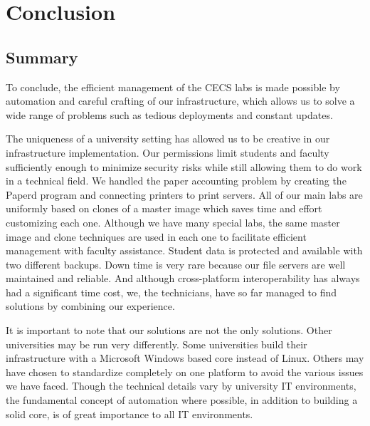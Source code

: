 \chapter{Conclusion} \label{ch:conclusion}
\section{Summary} \label{sec:summary}
To conclude, the efficient management of the CECS labs is made possible by automation and careful crafting of our infrastructure, which allows us to solve a wide range of problems such as tedious deployments and constant updates.  

The uniqueness of a university setting has allowed us to be creative in our infrastructure implementation.  Our permissions limit students and faculty sufficiently enough to minimize security risks while still allowing them to do work in a technical field.  We handled the paper accounting problem by creating the Paperd program and connecting printers to print servers.  All of our main labs are uniformly based on clones of a master image which saves time and effort customizing each one.  Although we have many special labs, the same master image and clone techniques are used in each one to facilitate efficient management with faculty assistance.  Student data is protected and available with two different backups.  Down time is very rare because our file servers are well maintained and reliable.  And although cross-platform interoperability has always had a significant time cost, we, the technicians, have so far managed to find solutions by combining our experience.

It is important to note that our solutions are not the only solutions.  Other universities may be run very differently.  Some universities build their infrastructure with a Microsoft Windows based core instead of Linux.  Others may have chosen to standardize completely on one platform to avoid the various issues we have faced.  Though the technical details vary by university IT environments, the fundamental concept of automation where possible, in addition to building a solid core, is of great importance to all IT environments. 
